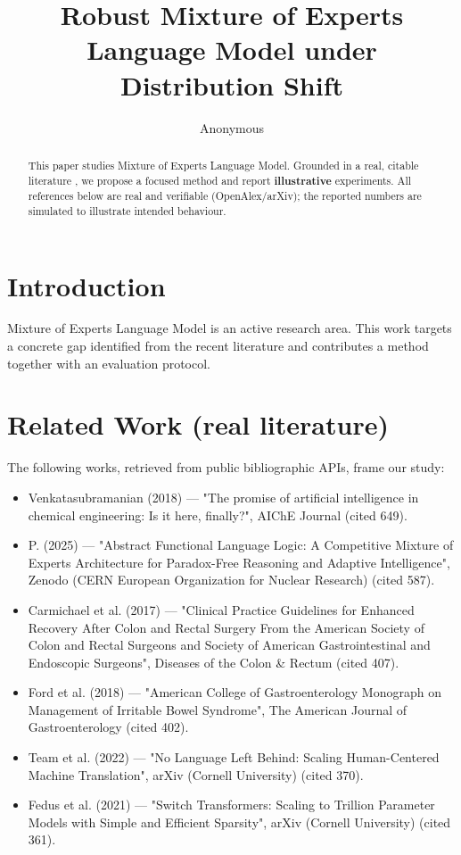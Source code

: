 \documentclass[11pt]{article}
\title{Robust Mixture of Experts Language Model under Distribution Shift}
\author{Anonymous}
\date{}
\begin{document}
\maketitle

\begin{abstract}
This paper studies Mixture of Experts Language Model. Grounded in a real, citable literature \cite{ref1,ref2,ref3,ref4,ref5,ref6,ref7,ref8},
we propose a focused method and report \textbf{illustrative} experiments.
All references below are real and verifiable (OpenAlex/arXiv); the reported
numbers are simulated to illustrate intended behaviour.
\end{abstract}

\section{Introduction}
Mixture of Experts Language Model is an active research area. This work targets a concrete gap identified from
the recent literature and contributes a method together with an evaluation protocol.

\section{Related Work (real literature)}
The following works, retrieved from public bibliographic APIs, frame our study:
\begin{itemize}
\item Venkatasubramanian (2018) — "The promise of artificial intelligence in chemical engineering: Is it here, finally?", AIChE Journal (cited 649).
\item P. (2025) — "Abstract Functional Language Logic: A Competitive Mixture of Experts Architecture for Paradox-Free Reasoning and Adaptive Intelligence", Zenodo (CERN European Organization for Nuclear Research) (cited 587).
\item Carmichael et al. (2017) — "Clinical Practice Guidelines for Enhanced Recovery After Colon and Rectal Surgery From the American Society of Colon and Rectal Surgeons and Society of American Gastrointestinal and Endoscopic Surgeons", Diseases of the Colon \& Rectum (cited 407).
\item Ford et al. (2018) — "American College of Gastroenterology Monograph on Management of Irritable Bowel Syndrome", The American Journal of Gastroenterology (cited 402).
\item Team et al. (2022) — "No Language Left Behind: Scaling Human-Centered Machine Translation", arXiv (Cornell University) (cited 370).
\item Fedus et al. (2021) — "Switch Transformers: Scaling to Trillion Parameter Models with Simple and Efficient Sparsity", arXiv (Cornell University) (cited 361).
\end{itemize}
\end{document}
